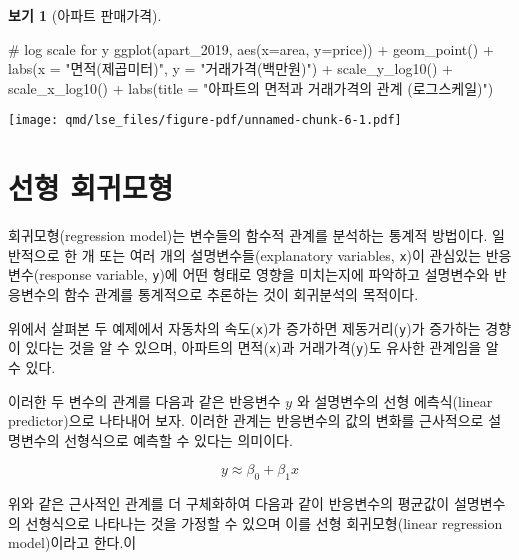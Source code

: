 \documentclass[
  11pt,
  a4paper,
  oneside]{scrbook}
\newenvironment{Shaded}{\begin{snugshade}}{\end{snugshade}}
\newcommand{\AttributeTok}[1]{\textcolor[rgb]{0.40,0.45,0.13}{#1}}
\newcommand{\CommentTok}[1]{\textcolor[rgb]{0.37,0.37,0.37}{#1}}
\newcommand{\FunctionTok}[1]{\textcolor[rgb]{0.28,0.35,0.67}{#1}}
\newcommand{\NormalTok}[1]{\textcolor[rgb]{0.00,0.23,0.31}{#1}}
\newcommand{\SpecialCharTok}[1]{\textcolor[rgb]{0.37,0.37,0.37}{#1}}
\newcommand{\StringTok}[1]{\textcolor[rgb]{0.13,0.47,0.30}{#1}}
\theoremstyle{definition}
\theoremstyle{plain}
\theoremstyle{definition}
\theoremstyle{definition}
\newtheorem{example}{보기}[chapter]
\theoremstyle{remark}
\begin{document}
\begin{example}[아파트
판매가격]
\begin{Shaded}
\begin{Highlighting}[]
\CommentTok{\# log scale for y}
\FunctionTok{ggplot}\NormalTok{(apart\_2019, }\FunctionTok{aes}\NormalTok{(}\AttributeTok{x=}\NormalTok{area, }\AttributeTok{y=}\NormalTok{price)) }\SpecialCharTok{+} \FunctionTok{geom\_point}\NormalTok{() }\SpecialCharTok{+} \FunctionTok{labs}\NormalTok{(}\AttributeTok{x =} \StringTok{"면적(제곱미터)"}\NormalTok{, }\AttributeTok{y =} \StringTok{"거래가격(백만원)"}\NormalTok{) }\SpecialCharTok{+}
  \FunctionTok{scale\_y\_log10}\NormalTok{() }\SpecialCharTok{+} 
  \FunctionTok{scale\_x\_log10}\NormalTok{() }\SpecialCharTok{+}
  \FunctionTok{labs}\NormalTok{(}\AttributeTok{title =} \StringTok{"아파트의 면적과 거래가격의 관계 (로그스케일)"}\NormalTok{)}
\end{Highlighting}
\end{Shaded}

\texttt{[image: qmd/lse\_files/figure-pdf/unnamed-chunk-6-1.pdf]}

\end{example}

\section{선형 회귀모형}\label{uxc120uxd615-uxd68cuxadc0uxbaa8uxd615}

회귀모형(regression model)는 변수들의 함수적 관계를 분석하는 통계적
방법이다. 일반적으로 한 개 또는 여러 개의 설명변수들(explanatory
variables, \texttt{x})이 관심있는 반응변수(response variable,
\texttt{y})에 어떤 형태로 영향을 미치는지에 파악하고 설명변수와
반응변수의 함수 관계를 통계적으로 추론하는 것이 회귀분석의 목적이다.

위에서 살펴본 두 예제에서 자동차의 속도(\texttt{x})가 증가하면
제동거리(\texttt{y})가 증가하는 경향이 있다는 것을 알 수 있으며,
아파트의 면적(\texttt{x})과 거래가격(\texttt{y})도 유사한 관계임을 알 수
있다.

이러한 두 변수의 관계를 다음과 같은 반응변수 \(y\) 와 설명변수의 선형
에측식(linear predictor)으로 나타내어 보자. 이러한 관계는 반응변수의
값의 변화를 근사적으로 설명변수의 선형식으로 예측할 수 있다는 의미이다.

\[ y \approx \beta_0 + \beta_1 x \]

위와 같은 근사적인 관계를 더 구체화하여 다음과 같이 반응변수의 평균값이
설명변수의 선형식으로 나타나는 것을 가정할 수 있으며 이를 선형
회귀모형(linear regression model)이라고 한다.이
\end{document}
